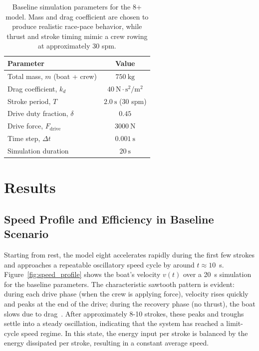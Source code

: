 \documentclass[12pt]{article}
\begin{document}
\begin{table}[!htbp]
\centering
\caption{Baseline simulation parameters for the 8+ model.  
Mass and drag coefficient are chosen to produce realistic race-pace behavior, while thrust and stroke timing mimic a crew rowing at approximately 30 spm.}
\label{tab:baseline_parameters}
\begin{tabular}{l c}
\hline
\textbf{Parameter} & \textbf{Value} \\
\hline
Total mass, $m$ (boat + crew) & $750\ \text{kg}$ \\
Drag coefficient, $k_d$ & $40\ \text{N}\cdot\text{s}^2/\text{m}^2$ \\
Stroke period, $T$ & $2.0\ \text{s}$ (30 spm) \\
Drive duty fraction, $\delta$ & $0.45$ \\
Drive force, $F_{\text{drive}}$ & $3000\ \text{N}$ \\
Time step, $\Delta t$ & $0.001\ \text{s}$ \\
Simulation duration & $20\ \text{s}$ \\
\hline
\end{tabular}
\end{table}

\newpage
\section{Results}

\subsection{Speed Profile and Efficiency in Baseline Scenario}

Starting from rest, the model eight accelerates rapidly during the first few strokes and approaches a repeatable oscillatory speed cycle by around $t \approx 10$~s. Figure~\ref{fig:speed_profile} shows the boat’s velocity $v(t)$ over a 20~s simulation for the baseline parameters. The characteristic sawtooth pattern is evident: during each drive phase (when the crew is applying force), velocity rises quickly and peaks at the end of the drive; during the recovery phase (no thrust), the boat slows due to drag~\cite{pulman2007, baudouinhawkins2002}. After approximately 8-10 strokes, these peaks and troughs settle into a steady oscillation, indicating that the system has reached a limit-cycle speed regime. In this state, the energy input per stroke is balanced by the energy dissipated per stroke, resulting in a constant average speed.
\end{document}
